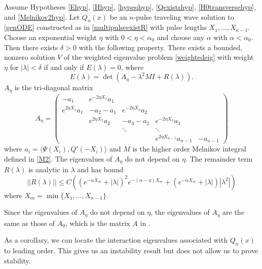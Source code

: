 \documentclass[thesis.tex]{subfiles}
\begin{document}
\begin{theorem}\label{expwtstabtheorem}
Assume Hypotheses \ref{Ehyp}, \ref{Hhyp}, \ref{hypeqhyp}, \ref{Qexistshyp}, \ref{H0transversehyp}, and \ref{Melnikov2hyp}. Let $Q_n(x)$ be an $n$-pulse traveling wave solution to \cref{genODE} constructed as in \cref{multipulseexistR} with pulse lengths $X_1, \dots, X_{n-1}$. Choose an exponential weight $\eta$ with $0 < \eta < \alpha_0$ and choose any $\alpha$  with $\alpha < \alpha_0$. Then there exists $\delta > 0$ with the following property. There exists a bounded, nonzero solution $V$ of the weighted eigenvalue problem \eqref{weightedeig} with weight $\eta$ for $|\lambda| < \delta$ if and only if $E(\lambda) = 0$, where
\[
E(\lambda) = \det \left( A_\eta - \lambda^2 M I + R(\lambda) \right).
\]
$A_\eta$ is the tri-diagonal matrix
\begin{equation}\label{Aeta}
A_\eta = \begin{pmatrix}
-a_1 & e^{-2 \eta X_1} a_1 \\
e^{2 \eta X_1} a_1 & -a_2 - a_1 & e^{-2 \eta X_2} a_2 \\
& e^{2 \eta X_2} a_2 & -a_3 - a_2 & e^{-2 \eta X_3} a_3 \\
&& \ddots & \ddots \\
& & & e^{2 \eta X_{n-1}} a_{n-1} & -a_{n-1} 
\end{pmatrix}
\end{equation}
where $a_i = \langle \Psi(X_i), Q'(-X_i) \rangle$ and $M$ is the higher order Melnikov integral defined in \cref{M2}. The eigenvalues of $A_\eta$ do not depend on $\eta$. The remainder term $R(\lambda)$ is analytic in $\lambda$ and has bound
\begin{equation*}
||R(\lambda)|| \leq C 
\left( (e^{-\alpha X_m} + |\lambda|)^2 e^{-(\alpha - \eta)X_m}  
+ (e^{-\alpha X_m} + |\lambda| )|\lambda^2| \right)
\end{equation*}
where $X_m = \min\{X_1, \dots, X_{n-1}\}$.
\end{theorem}

\begin{remark}
Since the eigenvalues of $A_\eta$ do not depend on $\eta$, the eigenvalues of $A_\eta$ are the same as those of $A_0$, which is the matrix $A$ in \cite[(2.8)]{Sandstede1998}.
\end{remark}

As a corollary, we can locate the interaction eigenvalues associated with $Q_n(x)$ to leading order. This gives us an instability result but does not allow us to prove stability.
\end{document}
